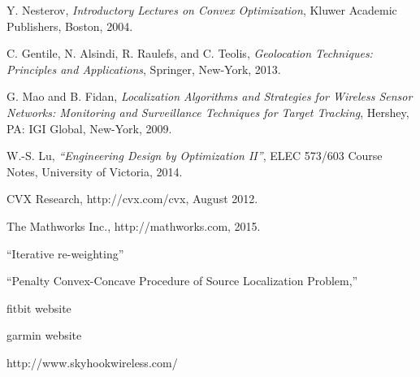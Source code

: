 \begin{thebibliography}{99}
Y. Nesterov, {\em Introductory Lectures on Convex Optimization}, Kluwer Academic Publishers, Boston, 2004.

C. Gentile, N. Alsindi, R. Raulefs, and C. Teolis, {\em Geolocation Techniques: Principles and Applications}, Springer, New-York, 2013.

G. Mao and B. Fidan, {\em Localization Algorithms and Strategies for Wireless Sensor Networks: Monitoring and Surveillance Techniques for Target Tracking},  Hershey, PA: IGI Global, New-York, 2009.

W.-S. Lu, {\em ``Engineering Design by Optimization II''}, ELEC 573/603 Course Notes, University of Victoria, 2014.

CVX Research, http://cvx.com/cvx, August 2012.

The Mathworks Inc., http://mathworks.com, 2015.

``Iterative re-weighting''

``Penalty Convex-Concave Procedure of Source Localization Problem,''


fitbit website

garmin website

http://www.skyhookwireless.com/


\end{thebibliography}